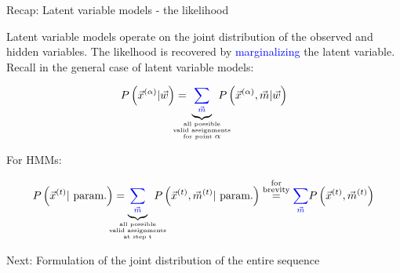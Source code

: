 \begin{frame}{Recap: Latent variable models - the likelihood}

Latent variable models operate on the joint distribution of the observed and hidden variables.
The likelhood is recovered by \textcolor{blue}{marginalizing} the latent variable.
Recall in the general case of latent variable models:

\begin{equation}
P \left( \vec{x}^{(\alpha)} | \vec{w} \right) =
\kern-3.5ex
\underbrace{{\color{blue}\sum_{\vec{m}}}}_{
\substack{
\text{\tiny all possible}\\
\text{\tiny valid assignments}\\
\text{\tiny for point }\alpha}} 
\kern-3ex
P \left( \vec{x}^{(\alpha)}, \vec{m} | \vec{w} \right)
\end{equation}

\pause

\svspace{-5mm}

For HMMs:

\svspace{-5mm}

\begin{equation}
P \left( \vec{x}^{(t)} |~\text{param.} \right) =
\kern-4ex
\underbrace{{\color{blue}\sum_{\vec{m}}}}_{
\substack{
\text{\tiny all possible}\\
\text{\tiny valid assignments}\\
\text{\tiny at step t}
}
}
\kern-3ex
P \left( \vec{x}^{(t)}, \vec{m}^{(t)} |~\text{param.} \right)
\stackrel{\substack{\text{for}\\
\text{brevity}}}{=}
{\color{blue}\sum_{\vec{m}}}
P \left( \vec{x}^{(t)}, \vec{m}^{(t)} \right)
\end{equation}

\pause

Next: Formulation of the joint distribution of the entire sequence

\pause



\end{frame}

